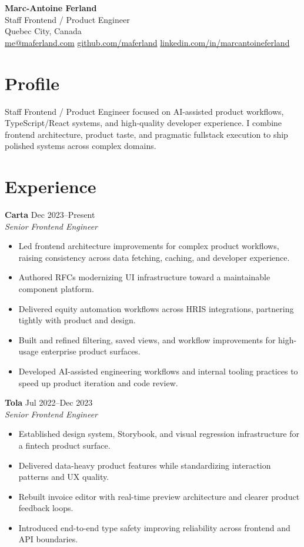 \documentclass[11pt]{article}
\begin{document}
\begin{center}
    {\LARGE \textbf{Marc-Antoine Ferland}} \\
    Staff Frontend / Product Engineer \\
    Quebec City, Canada \\
    \href{mailto:me@maferland.com}{me@maferland.com} \quad
    \href{https://github.com/maferland}{github.com/maferland} \quad
    \href{https://linkedin.com/in/marcantoineferland}{linkedin.com/in/marcantoineferland}
\end{center}

\section*{Profile}
Staff Frontend / Product Engineer focused on AI-assisted product workflows, TypeScript/React systems, and high-quality developer experience. I combine frontend architecture, product taste, and pragmatic fullstack execution to ship polished systems across complex domains.

\section*{Experience}

\textbf{Carta} \hfill Dec 2023--Present\\
\textit{Senior Frontend Engineer}
\begin{itemize}
    \item Led frontend architecture improvements for complex product workflows, raising consistency across data fetching, caching, and developer experience.
    \item Authored RFCs modernizing UI infrastructure toward a maintainable component platform.
    \item Delivered equity automation workflows across HRIS integrations, partnering tightly with product and design.
    \item Built and refined filtering, saved views, and workflow improvements for high-usage enterprise product surfaces.
    \item Developed AI-assisted engineering workflows and internal tooling practices to speed up product iteration and code review.
\end{itemize}

\textbf{Tola} \hfill Jul 2022--Dec 2023\\
\textit{Senior Frontend Engineer}
\begin{itemize}
    \item Established design system, Storybook, and visual regression infrastructure for a fintech product surface.
    \item Delivered data-heavy product features while standardizing interaction patterns and UX quality.
    \item Rebuilt invoice editor with real-time preview architecture and clearer product feedback loops.
    \item Introduced end-to-end type safety improving reliability across frontend and API boundaries.
\end{itemize}
\end{document}
